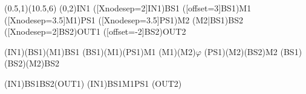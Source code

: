 \documentclass[pstricks]{standalone}
\begin{document}
	\begin{pspicture}(0.5,1)(10.5,6)
        \pnode(0,2){IN1}
        \pnode([Xnodesep=2]IN1){BS1}
        \pnode([offset=3]BS1){M1}
        \pnode([Xnodesep=3.5]M1){PS1}
        \pnode([Xnodesep=3.5]PS1){M2}
        \pnode(M2|BS1){BS2}
        \pnode([Xnodesep=2]BS2){OUT1}
        \pnode([offset=-2]BS2){OUT2}
        \begin{optexp}
            \beamsplitter[compname=BS1, labelangle=-45, labeloffset=1](IN1)(BS1)(M1){BS1}
            \mirror[compname=M1, labeloffset=0.6](BS1)(M1)(PS1){M1}
            \optbox[compname=PS1, innerlabel, optboxsize=1.0 0.8](M1)(M2){$\varphi$}
            \mirror[compname=M2, labeloffset=0.6](PS1)(M2)(BS2){M2}
            \beamsplitter[compname=BS2, labelangle=-45, labeloffset=1](BS1)(BS2)(M2){BS2}

			\drawbeam(IN1){BS1}{BS2}(OUT1)
			\drawbeam(IN1){BS1}{M1}{PS1}
			(OUT2)
        \end{optexp}
    \end{pspicture}
\end{document}
